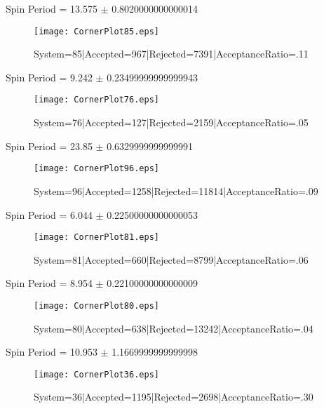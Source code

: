 \documentclass[10pt]{article}
\begin{document}
\listoffigures
\begin{center}
        Spin Period = 13.575 $\pm$ 0.8020000000000014
        \end{center}
\begin{figure}[h] 
        \texttt{[image: CornerPlot85.eps]}
        \caption{System=85|Accepted=967|Rejected=7391|AcceptanceRatio=.11}
        \label{S85}
        \centering
        \end{figure}
\begin{center}
        Spin Period = 9.242 $\pm$ 0.23499999999999943
        \end{center}
\begin{figure}[h] 
        \texttt{[image: CornerPlot76.eps]}
        \caption{System=76|Accepted=127|Rejected=2159|AcceptanceRatio=.05}
        \label{S76}
        \centering
        \end{figure}
\begin{center}
        Spin Period = 23.85 $\pm$ 0.6329999999999991
        \end{center}
\begin{figure}[h] 
        \texttt{[image: CornerPlot96.eps]}
        \caption{System=96|Accepted=1258|Rejected=11814|AcceptanceRatio=.09}
        \label{S96}
        \centering
        \end{figure}
\begin{center}
        Spin Period = 6.044 $\pm$ 0.22500000000000053
        \end{center}
\begin{figure}[h] 
        \texttt{[image: CornerPlot81.eps]}
        \caption{System=81|Accepted=660|Rejected=8799|AcceptanceRatio=.06}
        \label{S81}
        \centering
        \end{figure}
\begin{center}
        Spin Period = 8.954 $\pm$ 0.22100000000000009
        \end{center}
\begin{figure}[h] 
        \texttt{[image: CornerPlot80.eps]}
        \caption{System=80|Accepted=638|Rejected=13242|AcceptanceRatio=.04}
        \label{S80}
        \centering
        \end{figure}
\begin{center}
        Spin Period = 10.953 $\pm$ 1.1669999999999998
        \end{center}
\begin{figure}[h] 
        \texttt{[image: CornerPlot36.eps]}
        \caption{System=36|Accepted=1195|Rejected=2698|AcceptanceRatio=.30}
        \label{S36}
        \centering
        \end{figure}
\end{document}
